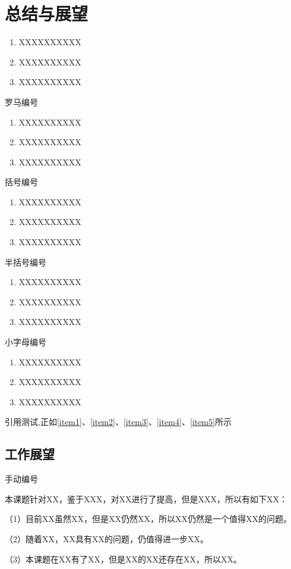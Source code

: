 \newpage


\section{总结与展望}

\begin{enumerate}
 \item XXXXXXXXXX
 \label{item1}
 \item XXXXXXXXXX
 \item XXXXXXXXXX
\end{enumerate}
罗马编号
\begin{enumerate}[label=(\roman*)]
 \item XXXXXXXXXX
 \label{item2}
 \item XXXXXXXXXX
 \item XXXXXXXXXX
\end{enumerate}
括号编号
\begin{enumerate}[label=(\arabic*)]
 \item XXXXXXXXXX
 \label{item3}
 \item XXXXXXXXXX
 \item XXXXXXXXXX
\end{enumerate}
半括号编号
\begin{enumerate}[label=\arabic*)]
 \item XXXXXXXXXX
 \label{item4}
 \item XXXXXXXXXX
 \item XXXXXXXXXX
\end{enumerate}
小字母编号
\begin{enumerate}[label=\alph*)]
 \item XXXXXXXXXX
 \label{item5}
 \item XXXXXXXXXX
 \item XXXXXXXXXX
\end{enumerate}

引用测试,正如\ref{item1}、\ref{item2}、\ref{item3}、\ref{item4}、\ref{item5}所示

\subsection{工作展望}
手动编号 %
\par
本课题针对XX，鉴于XXX，对XX进行了提高，但是XXX，所以有如下XX：

（1）目前XX虽然XX，但是XX仍然XX，所以XX仍然是一个值得XX的问题。

（2）随着XX，XX具有XX的问题，仍值得进一步XX。

（3）本课题在XX有了XX，但是XX的XX还存在XX，所以XX。


\newpage
